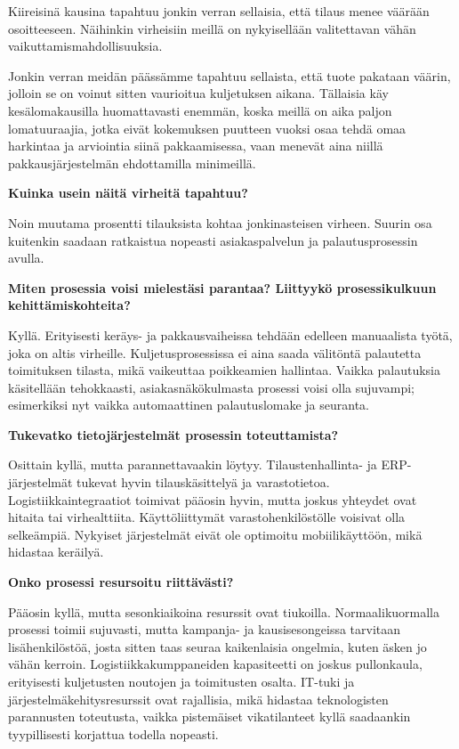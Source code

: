 \documentclass[
  finnish,
  letterpaper,
  DIV=11,
  numbers=noendperiod,
  oneside]{scrreprt}
\begin{document}
Kiireisinä kausina tapahtuu jonkin verran sellaisia, että tilaus menee
väärään osoitteeseen. Näihinkin virheisiin meillä on nykyisellään
valitettavan vähän vaikuttamismahdollisuuksia.

Jonkin verran meidän päässämme tapahtuu sellaista, että tuote pakataan
väärin, jolloin se on voinut sitten vaurioitua kuljetuksen aikana.
Tällaisia käy kesälomakausilla huomattavasti enemmän, koska meillä on
aika paljon lomatuuraajia, jotka eivät kokemuksen puutteen vuoksi osaa
tehdä omaa harkintaa ja arviointia siinä pakkaamisessa, vaan menevät
aina niillä pakkausjärjestelmän ehdottamilla minimeillä.

\textbf{Kuinka usein näitä virheitä tapahtuu?}

Noin muutama prosentti tilauksista kohtaa jonkinasteisen virheen. Suurin
osa kuitenkin saadaan ratkaistua nopeasti asiakaspalvelun ja
palautusprosessin avulla.

\textbf{Miten prosessia voisi mielestäsi parantaa? Liittyykö
prosessikulkuun kehittämiskohteita?}

Kyllä. Erityisesti keräys- ja pakkausvaiheissa tehdään edelleen
manuaalista työtä, joka on altis virheille. Kuljetusprosessissa ei aina
saada välitöntä palautetta toimituksen tilasta, mikä vaikeuttaa
poikkeamien hallintaa. Vaikka palautuksia käsitellään tehokkaasti,
asiakasnäkökulmasta prosessi voisi olla sujuvampi; esimerkiksi nyt
vaikka automaattinen palautuslomake ja seuranta.

\textbf{Tukevatko tietojärjestelmät prosessin toteuttamista?}

Osittain kyllä, mutta parannettavaakin löytyy. Tilaustenhallinta- ja
ERP-järjestelmät tukevat hyvin tilauskäsittelyä ja varastotietoa.
Logistiikkaintegraatiot toimivat pääosin hyvin, mutta joskus yhteydet
ovat hitaita tai virhealttiita. Käyttöliittymät varastohenkilöstölle
voisivat olla selkeämpiä. Nykyiset järjestelmät eivät ole optimoitu
mobiilikäyttöön, mikä hidastaa keräilyä.

\textbf{Onko prosessi resursoitu riittävästi?}

Pääosin kyllä, mutta sesonkiaikoina resurssit ovat tiukoilla.
Normaalikuormalla prosessi toimii sujuvasti, mutta kampanja- ja
kausisesongeissa tarvitaan lisähenkilöstöä, josta sitten taas seuraa
kaikenlaisia ongelmia, kuten äsken jo vähän kerroin.
Logistiikkakumppaneiden kapasiteetti on joskus pullonkaula, erityisesti
kuljetusten noutojen ja toimitusten osalta. IT-tuki ja
järjestelmäkehitysresurssit ovat rajallisia, mikä hidastaa teknologisten
parannusten toteutusta, vaikka pistemäiset vikatilanteet kyllä
saadaankin tyypillisesti korjattua todella nopeasti.
\end{document}
